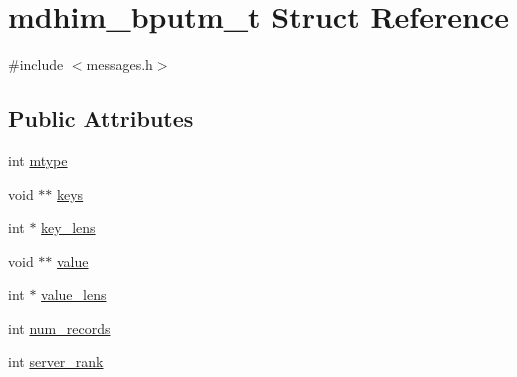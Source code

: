 \hypertarget{structmdhim__bputm__t}{\section{mdhim\-\_\-bputm\-\_\-t Struct Reference}
\label{d1/ddf/structmdhim__bputm__t}
}


{\ttfamily \#include $<$messages.\-h$>$}

\subsection*{Public Attributes}
\begin{DoxyCompactItemize}
\item 
int \hyperlink{structmdhim__bputm__t_a84865663becc6cfd06c5c7667b37244d}{mtype}
\item 
void $\ast$$\ast$ \hyperlink{structmdhim__bputm__t_a6cd17a8565bb662fdb1d52d878ce2a3d}{keys}
\item 
int $\ast$ \hyperlink{structmdhim__bputm__t_a528ae69dc41eab9b8e8d523d67debeac}{key\-\_\-lens}
\item 
void $\ast$$\ast$ \hyperlink{structmdhim__bputm__t_a08c5296effa1522fee1cc7ca9b790575}{value}
\item 
int $\ast$ \hyperlink{structmdhim__bputm__t_a915478fbead386af153b4b3989ff7fb6}{value\-\_\-lens}
\item 
int \hyperlink{structmdhim__bputm__t_ad075b00254b3f26231b57134995d017b}{num\-\_\-records}
\item 
int \hyperlink{structmdhim__bputm__t_afd28a1e8797725473429ebed5ccc6800}{server\-\_\-rank}
\end{DoxyCompactItemize}


